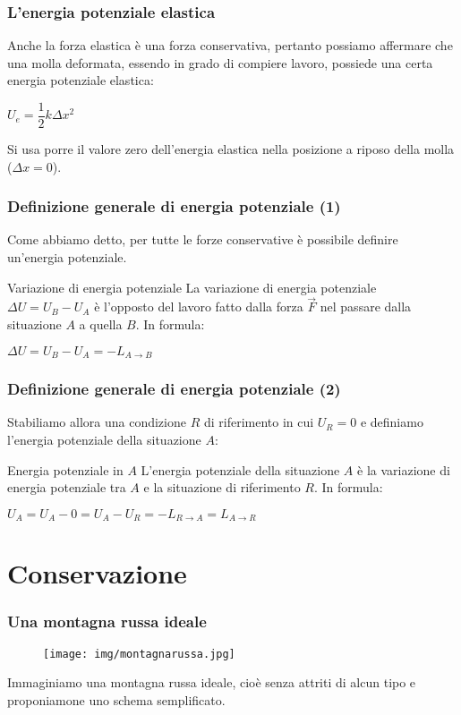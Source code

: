 \documentclass[]{beamer}
\theoremstyle{plain}
\begin{document}
\begin{frame}
  \frametitle{L'energia potenziale elastica}
  Anche la forza elastica è una forza conservativa, pertanto possiamo affermare che una molla deformata, essendo in grado di compiere lavoro, possiede una certa \alert{energia potenziale elastica}:
  \begin{center}
\colorbox{blue!30}{$ U_e = \dfrac{1}{2}k\Delta x^2 $}
\end{center}
Si usa porre il valore zero dell'energia elastica nella posizione a riposo della molla ($ \Delta x = 0 $).
\end{frame}


\begin{frame}
  \frametitle{Definizione generale di energia potenziale (1)}
Come abbiamo detto, per tutte le forze conservative è possibile definire un'energia potenziale.
\begin{block}{Variazione di energia potenziale}
  La variazione di energia potenziale $ \Delta U = U_B - U_A $ è l'opposto del lavoro fatto dalla forza $ \vec{F} $ nel passare dalla situazione $ A $ a quella $ B $. In formula:
  \begin{center}
\colorbox{blue!30}{$ \Delta U = U_B - U_A = - L_{A \rightarrow B} $}
\end{center}
\end{block}
\end{frame}


\begin{frame}
  \frametitle{Definizione generale di energia potenziale (2)}
Stabiliamo allora una condizione $ R $ di riferimento in cui $ U_R = 0 $ e definiamo l'energia potenziale della situazione $ A $:
\begin{block}{Energia potenziale in $ A $}
  L'energia potenziale della situazione $ A $ è la variazione di energia potenziale tra $ A $ e la situazione di riferimento $ R $. In formula:
  \begin{center}
\colorbox{blue!30}{$ U_A = U_A - 0 = U_A - U_R = -L_{R \rightarrow A} = L_{A \rightarrow R} $}
\end{center}
\end{block}
\end{frame}

\section{Conservazione}


\begin{frame}
\frametitle{Una montagna russa ideale}
\begin{figure}
  \texttt{[image: img/montagnarussa.jpg]}
\end{figure}
Immaginiamo una montagna russa ideale, cioè senza attriti di alcun tipo e proponiamone uno schema semplificato.
\end{frame}
\end{document}
